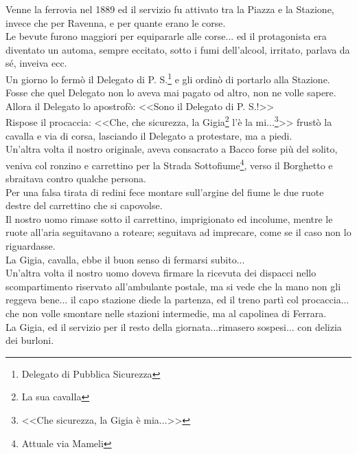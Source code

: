 \indent Venne la ferrovia nel 1889 ed il servizio fu attivato tra la Piazza e la Stazione, invece che per Ravenna, e per quante erano le corse.\\
\indent Le bevute furono maggiori per equipararle alle corse... ed il protagonista era diventato un automa, sempre eccitato, sotto i fumi dell'alcool, irritato, parlava da sé, inveiva ecc.\\
\indent Un giorno lo fermò il Delegato di P. S.\footnote{Delegato di Pubblica Sicurezza} e gli ordinò di portarlo alla Stazione. Fosse che quel Delegato non lo aveva mai pagato od altro, non ne volle sapere.\\
\indent Allora il Delegato lo apostrofò: <<Sono il Delegato di P. S.!>>\\
\indent Rispose il procaccia: <<Che, che sicurezza, la Gigia\footnote{La sua cavalla} l'è la mi...\footnote{<<Che sicurezza, la Gigia è mia...>>}>> frustò la cavalla e via di corsa, lasciando il Delegato a protestare, ma a piedi.\\
\indent Un'altra volta il nostro originale, aveva consacrato a Bacco forse più del solito, veniva col ronzino e carrettino per la Strada Sottofiume\footnote{Attuale via Mameli}, verso il Borghetto e sbraitava contro qualche persona.\\
\indent Per una falsa tirata di redini fece montare sull'argine del fiume le due ruote destre del carrettino che si capovolse.\\
\indent Il nostro uomo rimase sotto il carrettino, imprigionato ed incolume, mentre le ruote all'aria seguitavano a roteare; seguitava ad imprecare, come se il caso non lo riguardasse.\\
\indent La Gigia, cavalla, ebbe il buon senso di fermarsi subito...\\
\indent Un'altra volta il nostro uomo doveva firmare la ricevuta dei dispacci nello scompartimento riservato all'ambulante postale, ma si vede che la mano non gli reggeva bene... il capo stazione diede la partenza, ed il treno partì col procaccia... che non volle smontare nelle stazioni intermedie, ma al capolinea di Ferrara.\\
\indent La Gigia, ed il servizio per il resto della giornata...rimasero sospesi... con delizia dei burloni. \\












































%
